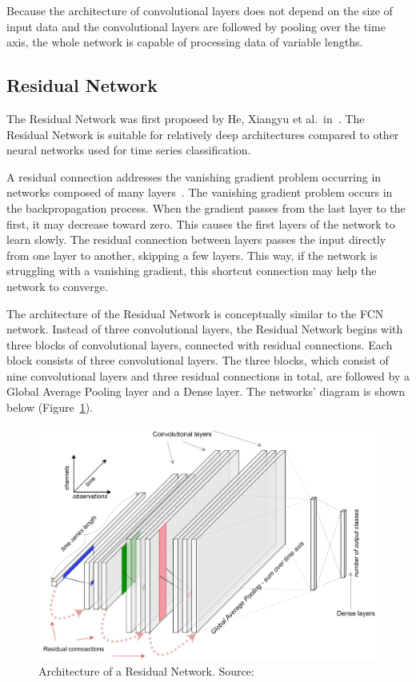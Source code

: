 \documentclass[a4paper,11pt,twoside]{report}
\theoremstyle{definition}
\begin{document}
\FloatBarrier

Because the architecture of convolutional layers does not depend on the size of input data and the convolutional layers are followed by pooling over the time axis, the whole network is capable of processing data of variable lengths.
\subsection{Residual Network}
The Residual Network was first proposed by He, Xiangyu et al.~in~\cite{residual}. The Residual Network is suitable for relatively deep architectures compared to other neural networks used for time series classification.

A residual connection addresses the vanishing gradient problem occurring in networks composed of many layers~\cite{residual}. The vanishing gradient problem occurs in the backpropagation process. When the gradient passes from the last layer to the first, it may decrease toward zero. This causes the first layers of the network to learn slowly. The residual connection between layers passes the input directly from one layer to another, skipping a few layers. This way, if the network is struggling with a vanishing gradient, this shortcut connection may help the network to converge.

The architecture of the Residual Network is conceptually similar to the FCN network. Instead of three convolutional layers, the Residual Network begins with three blocks of convolutional layers, connected with residual connections. Each block consists of three convolutional layers. The three blocks, which consist of nine convolutional layers and three residual connections in total, are followed by a Global Average Pooling layer and a Dense layer. The networks' diagram is shown below (Figure~\ref{fig:Resnet_img}).


\FloatBarrier

\begin{figure}[h!]
\centering
\includegraphics[width=15.5cm]{imgs/resnet.png}
\caption{Architecture of a Residual Network. Source:~\cite{dl_tsc}}
\label{fig:Resnet_img}
\end{figure}
\end{document}
